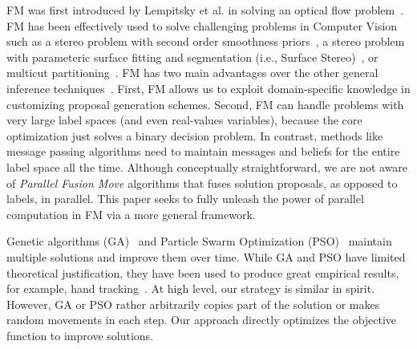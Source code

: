 
\noindent FM was first introduced by Lempitsky et al. in solving an
optical flow problem~\cite{first_fusion_viktor}. FM has been effectively
used to solve challenging problems in Computer Vision such as a stereo
problem with second order smoothness priors~\cite{woodford}, a stereo
problem with parameteric surface fitting and segmentation (i.e., Surface
Stereo)~\cite{surface_stereo}, or multicut
partitioning~\cite{fusionmovesforcorrelationclustering}.
%
FM has two main advantages over the other general inference
techniques~\cite{trw,loopy_belief_propagation}. First, FM allows us to
exploit domain-specific knowledge in customizing proposal generation
schemes. Second, FM can handle problems with very large label spaces
(and even real-values variables), because the core optimization just
solves a binary decision problem.
%
In contrast, methods like message passing algorithms need to maintain
messages and beliefs for the entire label space all the time.
%
Although conceptually straightforward, we are not aware of {\it Parallel
Fusion Move} algorithms that fuses solution proposals, as opposed to
labels, in parallel. This paper seeks to fully unleash the power of
parallel computation in FM via a more general framework.



\noindent
Genetic algorithms (GA)~\cite{ga} and Particle Swarm
Optimization (PSO)~\cite{pso} maintain multiple solutions and improve
them over time.
%
While GA and PSO have limited theoretical justification, they have been
used to produce great empirical results, for example, hand
tracking~\cite{pushmeet_hand_tracking}. At high level, our strategy is
similar in spirit. However, GA or PSO rather arbitrarily copies part of
the solution or makes random movements in each step. Our approach
directly optimizes the objective function to improve solutions.


